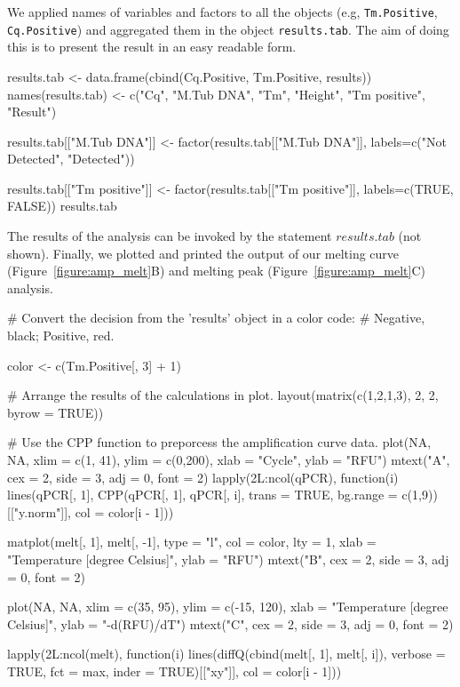 We applied names of variables and factors to all the objects (e.g, 
\texttt{Tm.Positive}, \texttt{Cq.Positive}) and aggregated them in the object 
\texttt{results.tab}. The aim of doing this is to present the result in an easy 
readable form.

\begin{example}
results.tab <- data.frame(cbind(Cq.Positive, Tm.Positive, results))
names(results.tab) <- c("Cq", "M.Tub DNA", "Tm", "Height", 
                        "Tm positive", "Result")

results.tab[["M.Tub DNA"]] <- factor(results.tab[["M.Tub DNA"]], 
                                     labels=c("Not Detected", "Detected"))

results.tab[["Tm positive"]] <- factor(results.tab[["Tm positive"]], 
                                       labels=c(TRUE, FALSE))
results.tab
\end{example}

The results of the analysis can be invoked by the statement $results.tab$ (not 
shown). Finally, we plotted and printed the output of our melting curve 
(Figure~\ref{figure:amp_melt}B) and melting peak (Figure~\ref{figure:amp_melt}C) 
analysis.

\begin{example}
# Convert the decision from the 'results' object in a color code:
# Negative, black; Positive, red.

color <- c(Tm.Positive[, 3] + 1)

# Arrange the results of the calculations in plot.
layout(matrix(c(1,2,1,3), 2, 2, byrow = TRUE))

# Use the CPP function to preporcess the amplification curve data.
plot(NA, NA, xlim = c(1, 41), ylim = c(0,200), xlab = "Cycle", ylab = "RFU")
mtext("A", cex = 2, side = 3, adj = 0, font = 2)
lapply(2L:ncol(qPCR), function(i) 
  lines(qPCR[, 1], 
        CPP(qPCR[, 1], qPCR[, i], trans = TRUE, 
            bg.range = c(1,9))[["y.norm"]],
        col = color[i - 1]))

matplot(melt[, 1], melt[, -1], type = "l", col = color, 
        lty = 1, xlab = "Temperature [degree Celsius]", ylab = "RFU")
mtext("B", cex = 2, side = 3, adj = 0, font = 2)

plot(NA, NA, xlim = c(35, 95), ylim = c(-15, 120), 
     xlab = "Temperature [degree Celsius]", 
     ylab = "-d(RFU)/dT")
mtext("C", cex = 2, side = 3, adj = 0, font = 2)

lapply(2L:ncol(melt), function(i)
  lines(diffQ(cbind(melt[, 1], melt[, i]), verbose = TRUE, 
              fct = max, inder = TRUE)[["xy"]], col = color[i - 1]))
\end{example}

